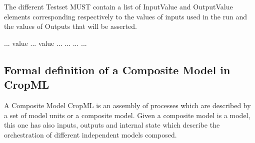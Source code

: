 \documentclass[letterpaper,10pt,english]{sphinxmanual}
\begin{document}
\begin{DUlineblock}{0em}
\item[] The different Testset MUST contain a list of InputValue and OutputValue elements corresponding respectively to the values
of inputs used in the run and the values of Outputs that will be asserted.
\end{DUlineblock}

%
\begin{sphinxVerbatim}[commandchars=\\\{\}]
    
   ...
            
           
          
             value
            ...
              value
            ...
         ...
      ...
  ...
\end{sphinxVerbatim}


\subsection{Formal definition of a Composite Model in CropML}
\label{\detokenize{user/description:formal-definition-of-a-composite-model-in-cropml}}
\begin{DUlineblock}{0em}
\item[] A Composite Model CropML is an assembly of processes which are described by a set of model units or a composite model.
Given a composite model is a model, this one has also inputs, outputs and internal state which describe the orchestration of different
independent models composed.
\end{DUlineblock}
\end{document}
